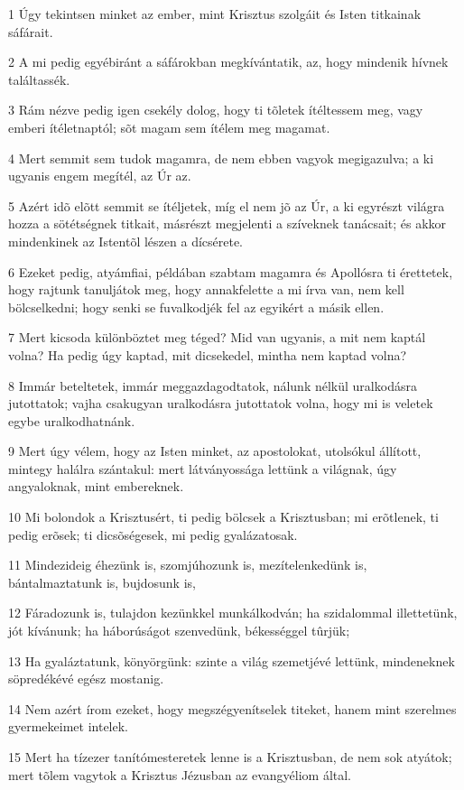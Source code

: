 \par 1 Úgy tekintsen minket az ember, mint Krisztus szolgáit és Isten titkainak  sáfárait.
\par 2 A mi pedig egyébiránt a sáfárokban megkívántatik, az, hogy mindenik hívnek találtassék.
\par 3 Rám nézve pedig igen csekély dolog, hogy ti tõletek ítéltessem meg, vagy emberi ítéletnaptól; sõt magam sem ítélem meg magamat.
\par 4 Mert semmit sem tudok magamra, de nem ebben vagyok megigazulva; a ki ugyanis engem megítél, az Úr  az.
\par 5 Azért idõ elõtt semmit se ítéljetek, míg el nem jõ az Úr, a ki egyrészt világra hozza  a sötétségnek titkait, másrészt megjelenti a szíveknek tanácsait; és akkor mindenkinek az Istentõl lészen a dícsérete.
\par 6 Ezeket pedig, atyámfiai, példában szabtam magamra és Apollósra ti érettetek, hogy rajtunk tanuljátok meg, hogy annakfelette a mi írva van, nem kell bölcselkedni; hogy senki se fuvalkodjék fel az egyikért a másik ellen.
\par 7 Mert kicsoda különböztet meg téged? Mid van ugyanis, a mit nem kaptál volna? Ha pedig úgy kaptad, mit dicsekedel, mintha nem kaptad volna?
\par 8 Immár beteltetek, immár meggazdagodtatok, nálunk nélkül uralkodásra jutottatok; vajha csakugyan uralkodásra jutottatok volna, hogy mi is veletek egybe uralkodhatnánk.
\par 9 Mert úgy vélem, hogy az Isten minket, az apostolokat, utolsókul állított, mintegy halálra szántakul: mert  látványossága lettünk a világnak, úgy angyaloknak, mint embereknek.
\par 10 Mi bolondok a Krisztusért, ti pedig bölcsek a Krisztusban; mi erõtlenek, ti pedig erõsek; ti dicsõségesek, mi pedig gyalázatosak.
\par 11 Mindezideig éhezünk is, szomjúhozunk is, mezítelenkedünk is, bántalmaztatunk is,  bujdosunk is,
\par 12 Fáradozunk is, tulajdon kezünkkel munkálkodván; ha szidalommal illettetünk,  jót kívánunk; ha háborúságot szenvedünk, békességgel tûrjük;
\par 13 Ha gyaláztatunk, könyörgünk: szinte a világ szemetjévé lettünk, mindeneknek söpredékévé egész mostanig.
\par 14 Nem azért írom ezeket, hogy megszégyenítselek titeket, hanem mint szerelmes gyermekeimet intelek.
\par 15 Mert ha tízezer tanítómesteretek lenne is a Krisztusban, de nem sok atyátok; mert tõlem vagytok a Krisztus Jézusban az evangyéliom által.

